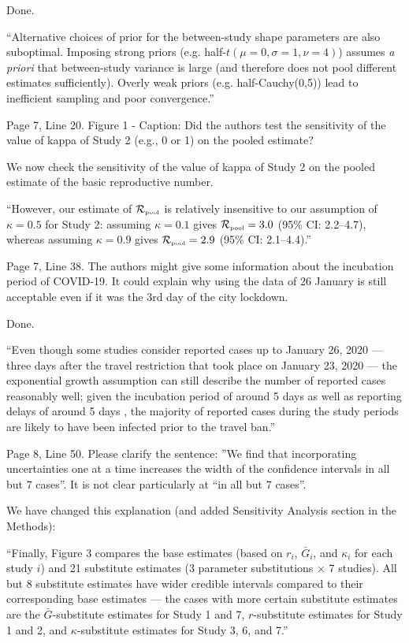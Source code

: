 \documentclass[12pt]{article}
\newcommand{\Rpool}{\ensuremath{{\mathcal R}_{\textrm{\tiny{pool}}}}\xspace}
\newcommand{\revtext}{\textsf}
\begin{document}
Done.

``Alternative choices of prior for the between-study shape parameters are also suboptimal. 
Imposing strong priors (e.g. half-$t(\mu=0,\sigma=1,\nu=4)$) assumes \textit{a priori} that between-study variance is large (and therefore does not pool different estimates sufficiently).
Overly weak priors (e.g. half-Cauchy(0,5)) lead to inefficient sampling and poor convergence.''

\revtext{Page 7, Line 20. Figure 1 - Caption: Did the authors test the sensitivity of the value of kappa of
Study 2 (e.g., 0 or 1) on the pooled estimate?}

We now check the sensitivity of the value of kappa of Study 2 on the pooled estimate of the basic reproductive number.

``However, our estimate of \Rpool is relatively insensitive to our assumption of $\kappa=0.5$ for Study 2: assuming $\kappa=0.1$ gives $\Rpool = 3.0$ (95\% CI: 2.2--4.7), whereas assuming $\kappa=0.9$ gives $\Rpool = 2.9$ (95\% CI: 2.1--4.4).''

\revtext{Page 7, Line 38. The authors might give some information about the incubation period of
COVID-19. It could explain why using the data of 26 January is still acceptable even if it was the
3rd day of the city lockdown.}

Done.

``Even though some studies consider reported cases up to January 26, 2020 --- three days after the travel restriction that took place on January 23, 2020 \citep{Tianeabb6105} --- the exponential growth assumption can still describe the number of reported cases reasonably well;
given the incubation period of around 5 days \citep{lauer2020incubation} as well as reporting delays of around 5 days \citep{sun2020early}, the majority of reported cases during the study periods are likely to have been infected prior to the travel ban.''

\revtext{Page 8, Line 50. Please clarify the sentence: ”We find that incorporating uncertainties one at a
time increases the width of the confidence intervals in all but 7 cases”. It is not clear particularly
at “in all but 7 cases”.}

We have changed this explanation (and added Sensitivity Analysis section in the Methods): 

``Finally, Figure 3 compares the base estimates (based on $r_i$, $\bar G_i$, and $\kappa_i$ for each study $i$) and 21 substitute estimates (3 parameter substitutions $\times$ 7 studies).
All but 8 substitute estimates have wider credible intervals compared to their corresponding base estimates --- the cases with more certain substitute estimates are the $\bar G$-substitute estimates for Study 1 and 7, $r$-substitute estimates for Study 1 and 2, and  $\kappa$-substitute estimates for Study 3, 6, and 7.''
\end{document}
